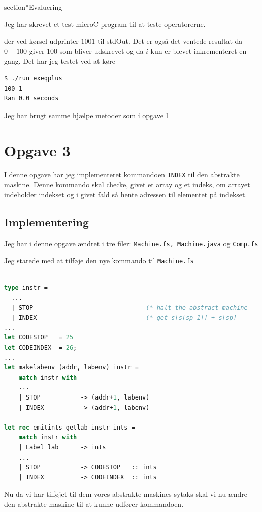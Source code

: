 \documentclass[danish,a4paper]{report}
\begin{document}
section*{Evaluering}

Jeg har skrevet et test microC program til at teste operatorerne.



der ved kørsel udprinter $100 1$ til stdOut. Det er også det ventede resultat da $0+100$ giver $100$ som bliver udskrevet og da $i$ kun er blevet inkrementeret en gang.  Det har jeg testet ved at køre 

\begin{lstlisting}[language=bash]
$ ./run exeqplus
100 1
Ran 0.0 seconds
\end{lstlisting}

Jeg har brugt samme hjælpe metoder som i opgave 1

\chapter*{Opgave 3}
I denne opgave har jeg implementeret kommandoen \texttt{INDEX} til den abstrakte maskine. Denne kommando skal checke, givet et array og et indeks, om arrayet indeholder indekset og i givet fald så hente adressen til elementet på indekset.

\section*{Implementering}
Jeg har i denne opgave ændret i tre filer: \texttt{Machine.fs, Machine.java} og \texttt{Comp.fs}

Jeg starede med at tilføje den nye kommando til \texttt{Machine.fs}

\begin{lstlisting}[language=ML]

type instr =
  ...
  | STOP                               (* halt the abstract machine       *)
  | INDEX                              (* get s[s[sp-1]] + s[sp]          *)
...
let CODESTOP   = 25
let CODEINDEX  = 26;
...
let makelabenv (addr, labenv) instr = 
    match instr with
    ...
    | STOP           -> (addr+1, labenv)
    | INDEX          -> (addr+1, labenv)

let rec emitints getlab instr ints = 
    match instr with
    | Label lab      -> ints
    ...
    | STOP           -> CODESTOP   :: ints
    | INDEX          -> CODEINDEX  :: ints
\end{lstlisting}

Nu da vi har tilføjet til dem vores abstrakte maskines sytaks skal vi nu ændre den abstrakte maskine til at kunne udfører kommandoen.
\end{document}
